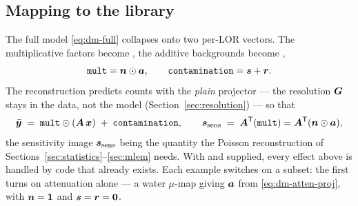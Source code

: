 \subsection{Mapping to the library}
\label{sec:datamodel:library}

The full model \eqref{eq:dm-full} collapses onto two per-LOR vectors. The
multiplicative factors become , the additive backgrounds become
,
\begin{equation}
  \texttt{mult} = \bm{n}\odot\bm{a} ,
  \qquad
  \texttt{contamination} = \bm{s} + \bm{r} .
  \label{eq:dm-map}
\end{equation}
The reconstruction predicts counts with the \emph{plain} projector --- the
resolution $\bm{G}$ stays in the data, not the model (Section~\ref{sec:resolution}) ---
so that
\begin{equation}
  \bar{\bm{y}} \;=\; \texttt{mult}\odot(\bm{A}\,\bm{x}) \;+\; \texttt{contamination} ,
  \qquad
  \bm{s}_{\mathrm{sens}} \;=\; \bm{A}^{\mathsf{T}}(\texttt{mult}) = \bm{A}^{\mathsf{T}}(\bm{n}\odot\bm{a}) ,
  \label{eq:dm-pred}
\end{equation}
the sensitivity image $\bm{s}_{\mathrm{sens}}$ being the quantity the Poisson reconstruction of
Sections~\ref{sec:statistics}--\ref{sec:mlem} needs. With  and
 supplied, every effect above is handled by code that already
exists. Each example switches on a subset: the first turns on attenuation alone
--- a water $\mu$-map giving $\bm{a}$ from \eqref{eq:dm-atten-proj}, with
$\bm{n}=\bm1$ and $\bm{s}=\bm{r}=\bm0$.
